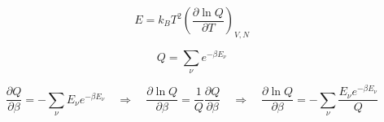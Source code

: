 \documentclass{article}
\begin{document}
\begin{flushleft}






\vspace{0.6cm}

\begin{equation*}
E = k_B T^2 \left( \frac{\partial \ln Q}{\partial T} \right)_{V,N}
\end{equation*}

\vspace{0.2cm}
\begin{equation*}
Q = \sum_\nu e^{-\beta E_\nu}
\end{equation*}

\begin{equation*}
\frac{\partial Q}{\partial \beta} = - \sum_\nu E_\nu e^{-\beta E_\nu} \quad \Rightarrow \quad \frac{\partial \ln Q}{\partial \beta} = \frac{1}{Q} \frac{\partial Q}{\partial \beta} \quad \Rightarrow \quad \frac{\partial \ln Q}{\partial \beta} = - \sum_\nu \frac{E_\nu e^{-\beta E_\nu}}{Q}
\end{equation*}

\end{flushleft}
\end{document}
